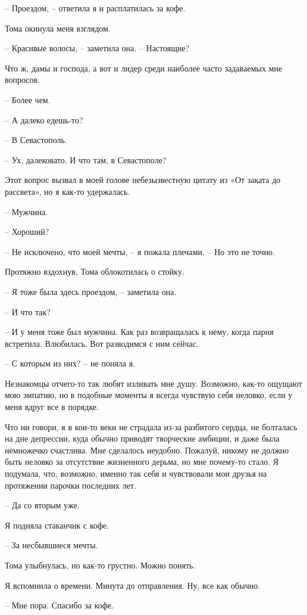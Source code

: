 \documentclass[
]{book}
\begin{document}
-- Проездом, -- ответила я и расплатилась за кофе.

Тома окинула меня взглядом.

-- Красивые волосы, -- заметила она. -- Настоящие?

Что ж, дамы и господа, а вот и лидер среди наиболее часто задаваемых мне вопросов.

-- Более чем.

-- А далеко едешь-то?

-- В Севастополь.

-- Ух, далековато. И что там, в Севастополе?

Этот вопрос вызвал в моей голове небезызвестную цитату из «От заката до рассвета», но я как-то удержалась.

-- Мужчина.

-- Хороший?

-- Не исключено, что моей мечты, -- я пожала плечами. -- Но это не точно.

Протяжно вздохнув, Тома облокотилась о стойку.

-- Я тоже была здесь проездом, -- заметила она.

-- И что так?

-- И у меня тоже был мужчина. Как раз возвращалась к нему, когда парня встретила. Влюбилась. Вот разводимся с ним сейчас.

-- С которым из них? -- не поняла я.

Незнакомцы отчего-то так любят изливать мне душу. Возможно, как-то ощущают мою эмпатию, но в подобные моменты я всегда чувствую себя неловко, если у меня вдруг все в порядке.

Что ни говори, я в кои-то веки не страдала из-за разбитого сердца, не болталась на дне депрессии, куда обычно приводят творческие амбиции, и даже была немножечко счастлива. Мне сделалось неудобно. Пожалуй, никому не должно быть неловко за отсутствие жизненного дерьма, но мне почему-то стало. Я подумала, что, возможно, именно так себя и чувствовали мои друзья на протяжении парочки последних лет.

-- Да со вторым уже.

Я подняла стаканчик с кофе.

-- За несбывшиеся мечты.

Тома улыбнулась, но как-то грустно. Можно понять.

Я вспомнила о времени. Минута до отправления. Ну, все как обычно.

-- Мне пора. Спасибо за кофе.
\end{document}
